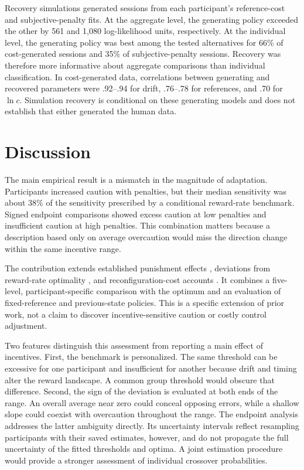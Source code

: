 \documentclass[10pt,letterpaper]{article}
\begin{document}
Recovery simulations generated sessions from each participant's reference-cost and subjective-penalty fits. At the aggregate level, the generating policy exceeded the other by 561 and 1,080 log-likelihood units, respectively. At the individual level, the generating policy was best among the tested alternatives for 66\% of cost-generated sessions and 35\% of subjective-penalty sessions. Recovery was therefore more informative about aggregate comparisons than individual classification. In cost-generated data, correlations between generating and recovered parameters were .92--.94 for drift, .76--.78 for references, and .70 for $\ln c$. Simulation recovery is conditional on these generating models and does not establish that either generated the human data.

\section{Discussion}
The main empirical result is a mismatch in the magnitude of adaptation. Participants increased caution with penalties, but their median sensitivity was about 38\% of the sensitivity prescribed by a conditional reward-rate benchmark. Signed endpoint comparisons showed excess caution at low penalties and insufficient caution at high penalties. This combination matters because a description based only on average overcaution would miss the direction change within the same incentive range.

The contribution extends established punishment effects \citep{leng2021}, deviations from reward-rate optimality \citep{bogacz2010,evans2017}, and reconfiguration-cost accounts \citep{grahek2022}. It combines a five-level, participant-specific comparison with the optimum and an evaluation of fixed-reference and previous-state policies. This is a specific extension of prior work, not a claim to discover incentive-sensitive caution or costly control adjustment.

Two features distinguish this assessment from reporting a main effect of incentives. First, the benchmark is personalized. The same threshold can be excessive for one participant and insufficient for another because drift and timing alter the reward landscape. A common group threshold would obscure that difference. Second, the sign of the deviation is evaluated at both ends of the range. An overall average near zero could conceal opposing errors, while a shallow slope could coexist with overcaution throughout the range. The endpoint analysis addresses the latter ambiguity directly. Its uncertainty intervals reflect resampling participants with their saved estimates, however, and do not propagate the full uncertainty of the fitted thresholds and optima. A joint estimation procedure would provide a stronger assessment of individual crossover probabilities.
\end{document}
